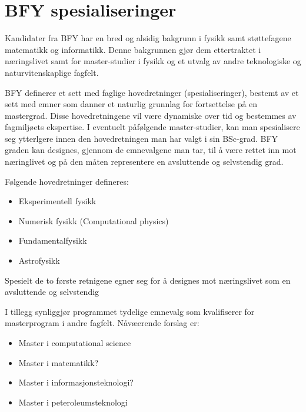 \chapter{BFY spesialiseringer}
\label{c:bfy-spec}

Kandidater fra BFY har en bred og alsidig bakgrunn i fysikk samt støttefagene matematikk og informatikk. Denne bakgrunnen gjør dem ettertraktet i næringslivet samt for master-studier i fysikk og et utvalg av andre teknologiske og naturvitenskaplige fagfelt. 

BFY definerer et sett med faglige hovedretninger (spesialiseringer), bestemt av et sett med emner som danner et naturlig grunnlag for fortsettelse på en mastergrad. 
Disse hovedretningene vil være dynamiske over tid og bestemmes av fagmiljøets ekspertise.
I eventuelt påfølgende master-studier, kan man spesialisere seg ytterlgere innen den hovedretningen man har valgt i sin BSc-grad.
BFY graden kan designes, gjennom de emnevalgene man tar, til å være rettet inn mot næringlivet og på den måten representere en avsluttende og selvstendig grad.      

Følgende hovedretninger defineres:

\begin{itemize}
	\item Eksperimentell  fysikk  
	\item Numerisk fysikk (Computational physics)
	\item Fundamentalfysikk
	\item Astrofysikk
\end{itemize}

Spesielt de to første retnigene egner seg for å designes mot næringslivet som en avsluttende og selvstendig

I tillegg synliggjør programmet tydelige emnevalg som kvalifiserer for masterprogram i andre fagfelt. Nåvæerende forslag er:

\begin{itemize}
	\item Master i computational science
	\item Master i matematikk?
	\item Master i informasjonsteknologi?
	\item Master i peteroleumsteknologi
\end{itemize}